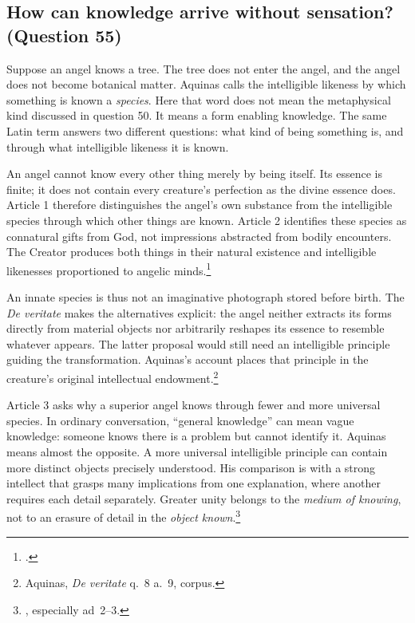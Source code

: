 
\subsection{How can knowledge arrive without sensation? (Question 55)}

Suppose an angel knows a tree. The tree does not enter the angel, and the angel does not become botanical matter. Aquinas calls the intelligible likeness by which something is known a \emph{species}. Here that word does not mean the metaphysical kind discussed in question 50. It means a form enabling knowledge. The same Latin term answers two different questions: what kind of being something is, and through what intelligible likeness it is known.

An angel cannot know every other thing merely by being itself. Its essence is finite; it does not contain every creature's perfection as the divine essence does. Article 1 therefore distinguishes the angel's own substance from the intelligible species through which other things are known. Article 2 identifies these species as connatural gifts from God, not impressions abstracted from bodily encounters. The Creator produces both things in their natural existence and intelligible likenesses proportioned to angelic minds.\footnote{.}

An innate species is thus not an imaginative photograph stored before birth. The \emph{De veritate} makes the alternatives explicit: the angel neither extracts its forms directly from material objects nor arbitrarily reshapes its essence to resemble whatever appears. The latter proposal would still need an intelligible principle guiding the transformation. Aquinas's account places that principle in the creature's original intellectual endowment.\footnote{Aquinas, \emph{De veritate} q.~8 a.~9, corpus.}

Article 3 asks why a superior angel knows through fewer and more universal species. In ordinary conversation, ``general knowledge'' can mean vague knowledge: someone knows there is a problem but cannot identify it. Aquinas means almost the opposite. A more universal intelligible principle can contain more distinct objects precisely understood. His comparison is with a strong intellect that grasps many implications from one explanation, where another requires each detail separately. Greater unity belongs to the \emph{medium of knowing}, not to an erasure of detail in the \emph{object known}.\footnote{, especially ad~2--3.}

